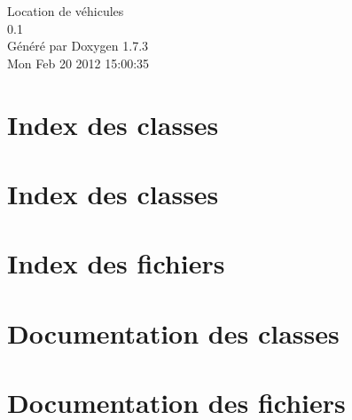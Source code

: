 \documentclass[a4paper]{book}
\begin{document}
\hypersetup{pageanchor=false}
\begin{titlepage}
\vspace*{7cm}
\begin{center}
{\Large Location de véhicules \\[1ex]\large 0.1 }\\
\vspace*{1cm}
{\large Généré par Doxygen 1.7.3}\\
\vspace*{0.5cm}
{\small Mon Feb 20 2012 15:00:35}\\
\end{center}
\end{titlepage}
\clearemptydoublepage
{}
\tableofcontents
\clearemptydoublepage
{}
\hypersetup{pageanchor=true}
\chapter{Index des classes}

\chapter{Index des classes}

\chapter{Index des fichiers}

\chapter{Documentation des classes}








\chapter{Documentation des fichiers}







\printindex
\end{document}
